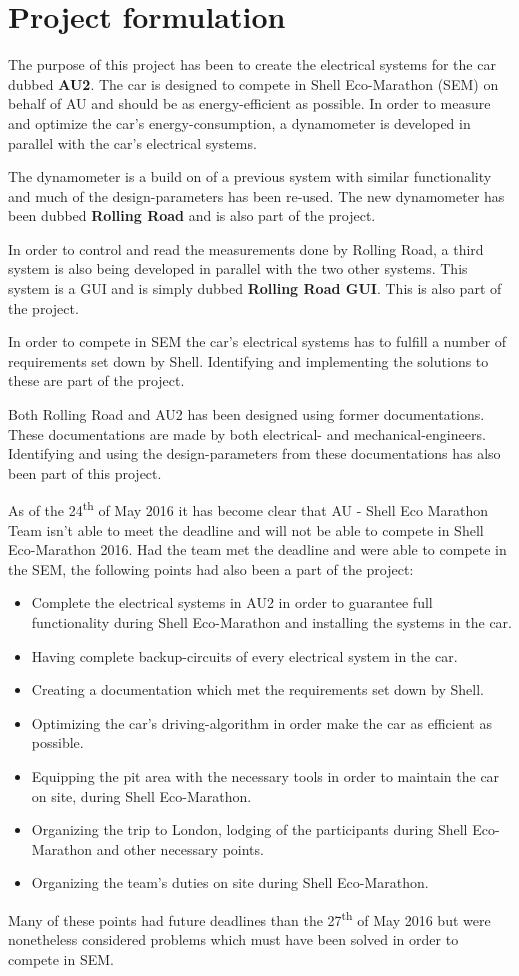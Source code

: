 \chapter{Project formulation}
The purpose of this project has been to create the electrical systems for the car dubbed \textbf{AU2}. The car is designed to compete in Shell Eco-Marathon (SEM) on behalf of AU and should be as energy-efficient as possible. In order to measure and optimize the car's energy-consumption, a dynamometer is developed in parallel with the car's electrical systems. 

The dynamometer is a build on of a previous system with similar functionality and much of the design-parameters has been re-used. The new dynamometer has been dubbed \textbf{Rolling Road} and is also part of the project.

In order to control and read the measurements done by Rolling Road, a third system is also being developed in parallel with the two other systems. This system is a GUI and is simply dubbed \textbf{Rolling Road GUI}. This is also part of the project.

In order to compete in SEM the car's electrical systems has to fulfill a number of requirements set down by Shell. Identifying and implementing the solutions to these are part of the project.

Both Rolling Road and AU2 has been designed using former documentations. These documentations are made by both electrical- and mechanical-engineers. Identifying and using the design-parameters from these documentations has also been part of this project.

As of the 24\textsuperscript{th} of May 2016 it has become clear that AU - Shell Eco Marathon Team isn't able to meet the deadline and will not be able to compete in Shell Eco-Marathon 2016. Had the team met the deadline and were able to compete in the SEM, the following points had also been a part of the project:
\begin{itemize}
	\item Complete the electrical systems in AU2 in order to guarantee full functionality during Shell Eco-Marathon and installing the systems in the car.
	\item Having complete backup-circuits of every electrical system in the car.
	\item Creating a documentation which met the requirements set down by Shell.
	\item Optimizing the car's driving-algorithm in order make the car as efficient as possible.
	\item Equipping the pit area with the necessary tools in order to maintain the car on site, during Shell Eco-Marathon.
	\item Organizing the trip to London, lodging of the participants during Shell Eco-Marathon and other necessary points.
	\item Organizing the team's duties on site during Shell Eco-Marathon.
\end{itemize}
Many of these points had future deadlines than the 27\textsuperscript{th} of May 2016 but were nonetheless considered problems which must have been solved in order to compete in SEM.